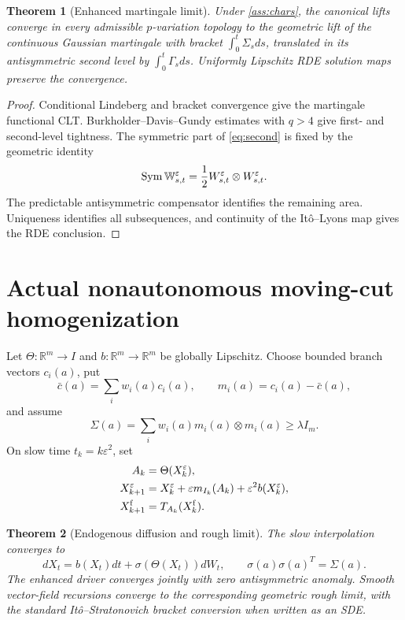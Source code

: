 \documentclass[11pt,reqno]{amsart}
\newtheorem{theorem}{Theorem}[section]
\theoremstyle{definition}
\theoremstyle{remark}
\newcommand{\R}{\mathbb R}
\begin{document}
\begin{theorem}[Enhanced martingale limit]\label{thm:rough}
Under \cref{ass:chars}, the canonical lifts converge in every admissible
$p$-variation topology to the geometric lift of the continuous Gaussian
martingale with bracket $\int_0^t\Sigma_sds$, translated in its antisymmetric
second level by $\int_0^t\Gamma_sds$.  Uniformly Lipschitz RDE solution maps
preserve the convergence.
\end{theorem}

\begin{proof}
Conditional Lindeberg and bracket convergence give the martingale functional
CLT.  Burkholder--Davis--Gundy estimates with $q>4$ give first- and
second-level tightness.  The symmetric part of \eqref{eq:second} is fixed by
the geometric identity
\[
 \operatorname{Sym}\mathbb W^\varepsilon_{s,t}
 ={1\over2}W^\varepsilon_{s,t}
  \otimes W^\varepsilon_{s,t}.
\]
The predictable antisymmetric compensator identifies the remaining area.
Uniqueness identifies all subsequences, and continuity of the It\^o--Lyons map
gives the RDE conclusion.
\end{proof}

\section{Actual nonautonomous moving-cut homogenization}\label{sec:actual}
Let $\Theta:\R^m\to I$ and $b:\R^m\to\R^m$ be globally Lipschitz.  Choose
bounded branch vectors $c_i(a)$, put
\[
 \bar c(a)=\sum_iw_i(a)c_i(a),
 \qquad m_i(a)=c_i(a)-\bar c(a),
\]
and assume
\[
 \Sigma(a)=\sum_iw_i(a)m_i(a)\otimes m_i(a)\ge\lambda I_m.
\]
On slow time $t_k=k\varepsilon^2$, set
\begin{align*}
 A_k&=\Theta(X_k^\varepsilon),\\
 X_{k+1}^\varepsilon&=X_k^\varepsilon+
 \varepsilon m_{I_k}(A_k)+\varepsilon^2b(X_k^\varepsilon),\\
 X_{k+1}^{\rm f}&=T_{A_k}(X_k^{\rm f}).
\end{align*}

\begin{theorem}[Endogenous diffusion and rough limit]\label{thm:homogenization}
The slow interpolation converges to
\[
 dX_t=b(X_t)dt+\sigma(\Theta(X_t))dW_t,
 \qquad\sigma(a)\sigma(a)^T=\Sigma(a).
\]
The enhanced driver converges jointly with zero antisymmetric anomaly.  Smooth
vector-field recursions converge to the corresponding geometric rough limit,
with the standard It\^o--Stratonovich bracket conversion when written as an
SDE.
\end{theorem}
\end{document}
